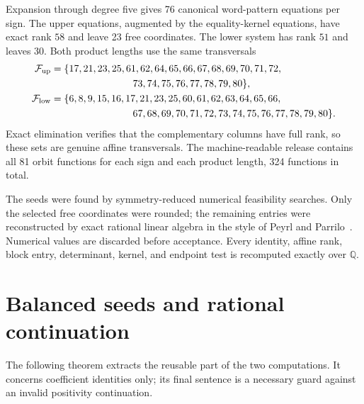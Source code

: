 \documentclass[11pt]{article}
\newcommand{\up}{\mathrm{up}}
\newcommand{\low}{\mathrm{low}}
\begin{document}
Expansion through degree five gives 76 canonical word-pattern equations per sign.  The upper equations, augmented by the equality-kernel equations, have exact rank \(58\) and leave 23 free coordinates.  The lower system has rank \(51\) and leaves 30.  Both product lengths use the same transversals
\begin{align*}
 \mathcal F_{\up}
 &=\{17,21,23,25,61,62,64,65,66,67,68,69,70,71,72,\\
 &\hspace{8.3em}73,74,75,76,77,78,79,80\},\\
 \mathcal F_{\low}
 &=\{6,8,9,15,16,17,21,23,25,60,61,62,63,64,65,66,\\
 &\hspace{8.3em}67,68,69,70,71,72,73,74,75,76,77,78,79,80\}.
\end{align*}
Exact elimination verifies that the complementary columns have full rank, so these sets are genuine affine transversals.  The machine-readable release contains all 81 orbit functions for each sign and each product length, 324 functions in total.

The seeds were found by symmetry-reduced numerical feasibility searches.  Only the selected free coordinates were rounded; the remaining entries were reconstructed by exact rational linear algebra in the style of Peyrl and Parrilo~\cite{PeyrlParrilo2008}.  Numerical values are discarded before acceptance.  Every identity, affine rank, block entry, determinant, kernel, and endpoint test is recomputed exactly over \(\mathbb Q\).

\section{Balanced seeds and rational continuation}\label{sec:continuation}

The following theorem extracts the reusable part of the two computations.
It concerns coefficient identities only; its final sentence is a necessary
guard against an invalid positivity continuation.
\end{document}
